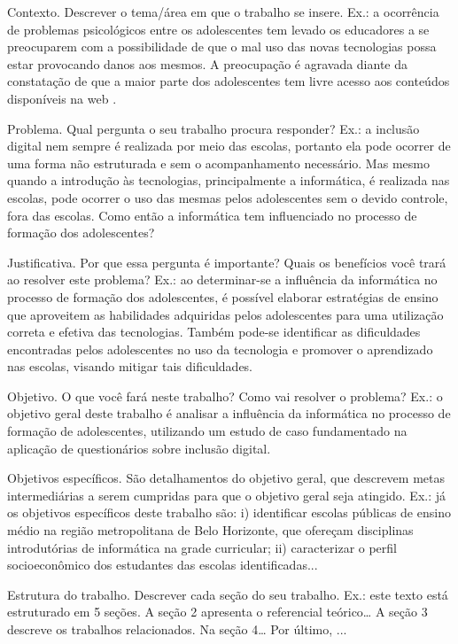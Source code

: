 	Contexto. Descrever o tema/área em que o trabalho se insere. 
	Ex.: a ocorrência de problemas psicológicos entre os adolescentes tem levado os educadores a se preocuparem com a possibilidade de que o mal uso das novas tecnologias possa estar provocando danos aos mesmos. A preocupação é agravada diante da constatação de que a maior parte dos adolescentes tem livre acesso aos conteúdos disponíveis na web \cite{citelli2004,martins2012}.
	
 Problema. Qual pergunta o seu trabalho procura responder? 
	Ex.: a inclusão digital nem sempre é realizada por meio das escolas, portanto ela pode ocorrer de uma forma não estruturada e sem o acompanhamento necessário. Mas mesmo quando a introdução às tecnologias, principalmente a informática, é realizada nas escolas, pode ocorrer o uso das mesmas pelos adolescentes sem o devido controle, fora das escolas. Como então a informática tem influenciado no processo de formação dos adolescentes?
	
 Justificativa. Por que essa pergunta é importante? Quais os benefícios você trará ao resolver este problema?
	Ex.: ao determinar-se a influência da informática no processo de formação dos adolescentes, é possível elaborar estratégias de ensino que aproveitem as habilidades adquiridas pelos adolescentes para uma utilização correta e efetiva das tecnologias. Também pode-se identificar as dificuldades encontradas pelos adolescentes no uso da tecnologia e promover o aprendizado nas escolas, visando mitigar tais dificuldades.
	
 Objetivo. O que você fará neste trabalho? Como vai resolver o problema?
	Ex.: o objetivo geral deste trabalho é analisar a influência da informática no processo de formação de adolescentes, utilizando um estudo de caso fundamentado na aplicação de questionários sobre inclusão digital.
	
 Objetivos específicos. São detalhamentos do objetivo geral, que descrevem metas intermediárias a serem cumpridas para que o objetivo geral seja atingido.
	Ex.: já os objetivos específicos deste trabalho são: i) identificar escolas públicas de ensino médio na região metropolitana de Belo Horizonte, que ofereçam disciplinas introdutórias de informática na grade curricular; ii) caracterizar o perfil socioeconômico dos estudantes das escolas identificadas...
	
 Estrutura do trabalho. Descrever cada seção do seu trabalho.	
	Ex.: este texto está estruturado em 5 seções. A seção 2 apresenta o referencial teórico… A seção 3 descreve os trabalhos relacionados. Na seção 4… Por último, ...


